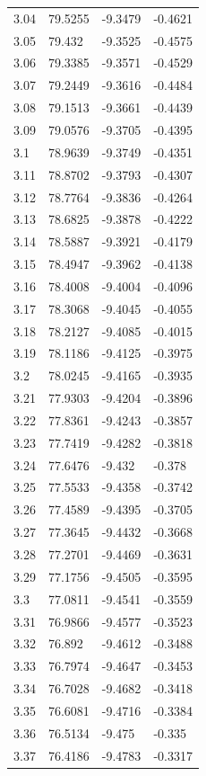 \begin{tabular}{llll}
3.04 & 79.5255 & -9.3479 & -0.4621 \\
3.05 & 79.432 & -9.3525 & -0.4575 \\
3.06 & 79.3385 & -9.3571 & -0.4529 \\
3.07 & 79.2449 & -9.3616 & -0.4484 \\
3.08 & 79.1513 & -9.3661 & -0.4439 \\
3.09 & 79.0576 & -9.3705 & -0.4395 \\
3.1 & 78.9639 & -9.3749 & -0.4351 \\
3.11 & 78.8702 & -9.3793 & -0.4307 \\
3.12 & 78.7764 & -9.3836 & -0.4264 \\
3.13 & 78.6825 & -9.3878 & -0.4222 \\
3.14 & 78.5887 & -9.3921 & -0.4179 \\
3.15 & 78.4947 & -9.3962 & -0.4138 \\
3.16 & 78.4008 & -9.4004 & -0.4096 \\
3.17 & 78.3068 & -9.4045 & -0.4055 \\
3.18 & 78.2127 & -9.4085 & -0.4015 \\
3.19 & 78.1186 & -9.4125 & -0.3975 \\
3.2 & 78.0245 & -9.4165 & -0.3935 \\
3.21 & 77.9303 & -9.4204 & -0.3896 \\
3.22 & 77.8361 & -9.4243 & -0.3857 \\
3.23 & 77.7419 & -9.4282 & -0.3818 \\
3.24 & 77.6476 & -9.432 & -0.378 \\
3.25 & 77.5533 & -9.4358 & -0.3742 \\
3.26 & 77.4589 & -9.4395 & -0.3705 \\
3.27 & 77.3645 & -9.4432 & -0.3668 \\
3.28 & 77.2701 & -9.4469 & -0.3631 \\
3.29 & 77.1756 & -9.4505 & -0.3595 \\
3.3 & 77.0811 & -9.4541 & -0.3559 \\
3.31 & 76.9866 & -9.4577 & -0.3523 \\
3.32 & 76.892 & -9.4612 & -0.3488 \\
3.33 & 76.7974 & -9.4647 & -0.3453 \\
3.34 & 76.7028 & -9.4682 & -0.3418 \\
3.35 & 76.6081 & -9.4716 & -0.3384 \\
3.36 & 76.5134 & -9.475 & -0.335 \\
3.37 & 76.4186 & -9.4783 & -0.3317 \\

\end{tabular}
